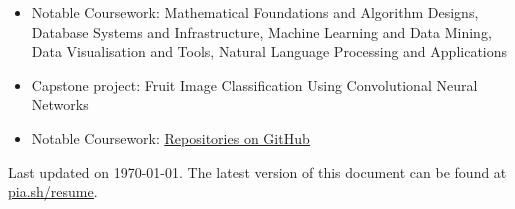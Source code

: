 \documentclass[10pt,a4paper,ragged2e]{altacv}
\begin{document}
\begin{itemize}
\item Notable Coursework: Mathematical Foundations and Algorithm Designs, Database Systems and Infrastructure, Machine Learning and Data Mining, Data Visualisation and Tools, Natural Language Processing and Applications
\end{itemize}
\smallskip
{}
\begin{itemize}
\item Capstone project: Fruit Image Classification Using Convolutional Neural Networks
\item Notable Coursework: \href{https://github.com/maacpiash?tab=repositories&q=CSE}{\underline{Repositories on GitHub}}
\end{itemize}



\begin{fullwidth}

\medskip
\medskip
\medskip

Last updated on \today. The latest version of this document can be found at \href{https://pia.sh/resume}{\underline{pia.sh/resume}}.

\end{fullwidth}

\end{document}
